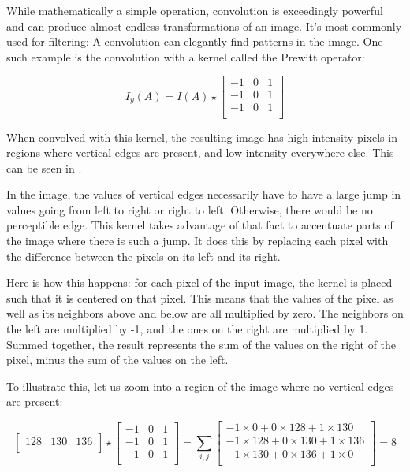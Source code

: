 While mathematically a simple operation, convolution is exceedingly powerful and can produce almost endless transformations of an image. It's most commonly used for filtering: A convolution can elegantly find patterns in the image. One such example is the convolution with a kernel called the Prewitt operator:

\begin{equation}
I_y(A) = I(A) \star \begin{bmatrix}
-1 & 0 & 1\\
-1 & 0 & 1\\
-1 & 0 & 1\\
\end{bmatrix}
\end{equation}

When convolved with this kernel, the resulting image has high-intensity pixels in regions where vertical edges are present, and low intensity everywhere else. This can be seen in .



In the image, the values of vertical edges necessarily have to have a large jump in values going from left to right or right to left. Otherwise, there would be no perceptible edge. This kernel takes advantage of that fact to accentuate parts of the image where there is such a jump. It does this by replacing each pixel with the difference between the pixels on its left and its right.

Here is how this happens: for each pixel of the input image, the kernel is placed such that it is centered on that pixel. This means that the values of the pixel as well as its neighbors above and below are all multiplied by zero. The neighbors on the left are multiplied by -1, and the ones on the right are multiplied by 1. Summed together, the result represents the sum of the values on the right of the pixel, minus the sum of the values on the left.

To illustrate this, let us zoom into a region of the image where no vertical edges are present:

\[
\begin{bmatrix}
128 & 130 & 136\\
\end{bmatrix}
\star
\begin{bmatrix}
-1 & 0 & 1\\
-1 & 0 & 1\\
-1 & 0 & 1\\
\end{bmatrix}
=
\sum_{i,j}
\begin{bmatrix}
-1 \times 0 + 0 \times 128 + 1 \times 130\\ 
-1 \times 128 + 0 \times 130 + 1 \times 136\\
-1 \times 130 + 0 \times 136 + 1 \times 0\\
\end{bmatrix}
= 8
\]

